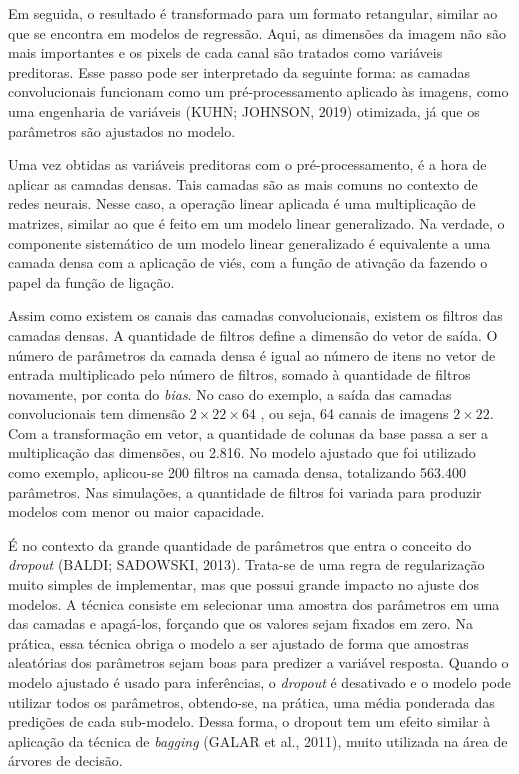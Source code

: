 \documentclass[12pt,twoside,brazilian]{book}
\begin{document}
Em seguida, o resultado é transformado para um formato retangular,
similar ao que se encontra em modelos de regressão. Aqui, as dimensões
da imagem não são mais importantes e os pixels de cada canal são
tratados como variáveis preditoras. Esse passo pode ser interpretado da
seguinte forma: as camadas convolucionais funcionam como um
pré-processamento aplicado às imagens, como uma engenharia de variáveis
(KUHN; JOHNSON, 2019) otimizada, já que os parâmetros são ajustados no
modelo.

Uma vez obtidas as variáveis preditoras com o pré-processamento, é a
hora de aplicar as camadas densas. Tais camadas são as mais comuns no
contexto de redes neurais. Nesse caso, a operação linear aplicada é uma
multiplicação de matrizes, similar ao que é feito em um modelo linear
generalizado. Na verdade, o componente sistemático de um modelo linear
generalizado é equivalente a uma camada densa com a aplicação de viés,
com a função de ativação da fazendo o papel da função de ligação.

Assim como existem os canais das camadas convolucionais, existem os
filtros das camadas densas. A quantidade de filtros define a dimensão do
vetor de saída. O número de parâmetros da camada densa é igual ao número
de itens no vetor de entrada multiplicado pelo número de filtros, somado
à quantidade de filtros novamente, por conta do \emph{bias}. No caso do
exemplo, a saída das camadas convolucionais tem dimensão
\(2\times22\times64\) , ou seja, 64 canais de imagens \(2\times 22\).
Com a transformação em vetor, a quantidade de colunas da base passa a
ser a multiplicação das dimensões, ou 2.816. No modelo ajustado que foi
utilizado como exemplo, aplicou-se 200 filtros na camada densa,
totalizando 563.400 parâmetros. Nas simulações, a quantidade de filtros
foi variada para produzir modelos com menor ou maior capacidade.

É no contexto da grande quantidade de parâmetros que entra o conceito do
\emph{dropout} (BALDI; SADOWSKI, 2013). Trata-se de uma regra de
regularização muito simples de implementar, mas que possui grande
impacto no ajuste dos modelos. A técnica consiste em selecionar uma
amostra dos parâmetros em uma das camadas e apagá-los, forçando que os
valores sejam fixados em zero. Na prática, essa técnica obriga o modelo
a ser ajustado de forma que amostras aleatórias dos parâmetros sejam
boas para predizer a variável resposta. Quando o modelo ajustado é usado
para inferências, o \emph{dropout} é desativado e o modelo pode utilizar
todos os parâmetros, obtendo-se, na prática, uma média ponderada das
predições de cada sub-modelo. Dessa forma, o dropout tem um efeito
similar à aplicação da técnica de \emph{bagging} (GALAR et al., 2011),
muito utilizada na área de árvores de decisão.
\end{document}
